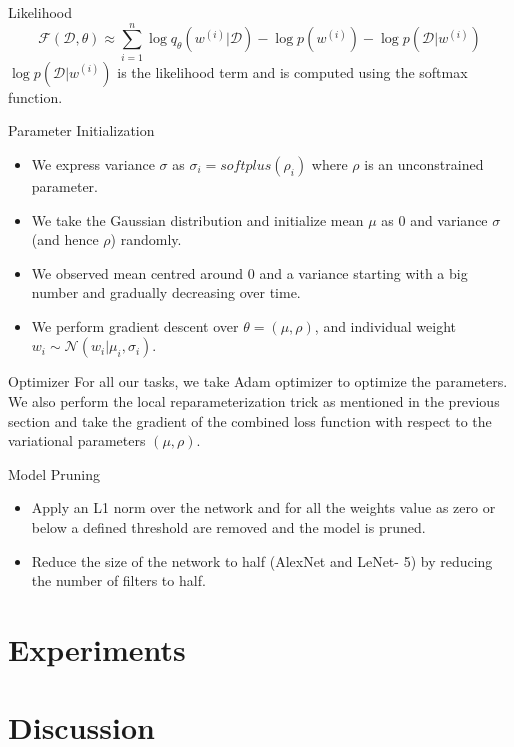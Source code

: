 \documentclass{beamer}
\begin{document}
\begin{frame}{Likelihood}
  \[
    \mathcal{F}(\mathcal{D}, \theta) \approx \sum_{i = 1}^n \log q_\theta(w^{(i)}|\mathcal{D}) - \log p(w^{(i)}) - \log p(\mathcal{D}|w^{(i)})
  \]
  $\log p(\mathcal{D}|w^{(i)})$ is the likelihood term and is computed using the softmax function.  
\end{frame}
\begin{frame}{Parameter Initialization}
  \begin{itemize}
    \item We express variance $\sigma$ as $\sigma_i = \textit{softplus}(\rho_i)$ where $\rho$ is an unconstrained parameter.
    \item We take the Gaussian distribution and initialize mean $\mu$ as 0 and variance $\sigma$ (and hence $\rho$) randomly. 
    \item We observed mean centred around 0 and a variance starting with a big number and gradually decreasing over time.
    \item We perform gradient descent over $\theta = (\mu, \rho)$, and individual weight $w_i \sim \mathcal{N}(w_i|\mu_i, \sigma_i)$.
  \end{itemize}
\end{frame}
\begin{frame}{Optimizer}
  For all our tasks, we take Adam optimizer to optimize the parameters. We also perform
  the local reparameterization trick as mentioned in the previous section and take the gradient
  of the combined loss function with respect to the variational parameters $(\mu, \rho)$.
\end{frame}
\begin{frame}{Model Pruning}
  \begin{itemize}
    \item Apply an L1 norm over the network and for all the weights value as zero or below a defined threshold are removed and the model is pruned.
    \item Reduce the size of the network to half (AlexNet and LeNet- 5) by reducing the number of filters to half.
  \end{itemize}
\end{frame}

\section{Experiments}

\section{Discussion}
\begin{frame}
  
\end{frame}

\end{document}
